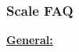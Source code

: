 \documentclass[12pt]{article}
\begin{document}

\subsubsection*{Scale FAQ}
\vspace{-10pt}
\noindent\underline{\textbf{General:}}
\def\Hitem{\item [Q\stepcounter{enumi}\arabic{enumi}.]} 
\def\Hsubitem{\item [Q\arabic{enumi}.\arabic{enumi}.]} 
\vspace{-0.5cm}
\end{document}
